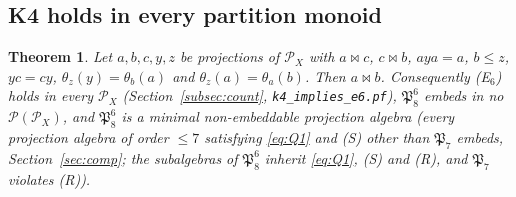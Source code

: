 \documentclass[11pt]{amsart}
\newtheorem{theorem}{Theorem}[section]
\theoremstyle{definition}
\renewcommand{\P}{\mathcal{P}}
\newcommand{\mt}{\bowtie}   %
\begin{document}
\subsection{K4 holds in every partition monoid}\label{subsec:K4}

\begin{theorem}\label{thm:K4}
Let $a,b,c,y,z$ be projections of $\P_X$ with $a\mt c$, $c\mt b$, $aya=a$, $b\le z$, $yc=cy$, $\theta_z(y)=\theta_b(a)$ and $\theta_z(a)=\theta_a(b)$. Then $a\mt b$. Consequently \textup{(E$_6$)} holds in every $\P_X$ (Section~\ref{subsec:count}, \texttt{k4\_implies\_e6.pf}), $\mathfrak P_8^6$ embeds in no $\P(\P_X)$, and $\mathfrak P_8^6$ is a minimal non-embeddable projection algebra (every projection algebra of order $\le7$ satisfying \eqref{eq:Q1} and \textup{(S)} other than $\mathfrak P_7$ embeds, Section~\ref{sec:comp}; the subalgebras of $\mathfrak P_8^6$ inherit \eqref{eq:Q1}, \textup{(S)} and \textup{(R)}, and $\mathfrak P_7$ violates \textup{(R)}).
\end{theorem}
\end{document}

